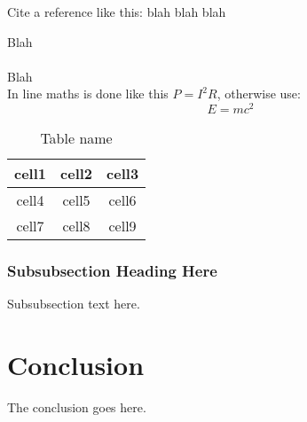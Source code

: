 \documentclass[journal]{IEEEtran}
\begin{document}
Cite a reference like this: blah blah blah \cite{examplecite} %

\newpage %

Blah\\\\ %

Blah\\ %

In line maths is done like this $P=I^{2}R$, otherwise use:
\begin{equation}
E=mc^{2}
\label{Eq:E} %
\end{equation}


\begin {table}[h!]
\begin{center}
\label{tab:cells} %
\caption{Table name}
\begin{tabular}{ |c|c|c| } 
 \hline
 cell1 & cell2 & cell3 \\  \hline
 cell4 & cell5 & cell6 \\  \hline
 cell7 & cell8 & cell9 \\  \hline
\end{tabular}
\end{center}
\end{table}

\subsubsection{Subsubsection Heading Here}
Subsubsection text here. 
\lipsum[10] %



\section{Conclusion}
The conclusion goes here.
\lipsum[10] %

\end{document}
